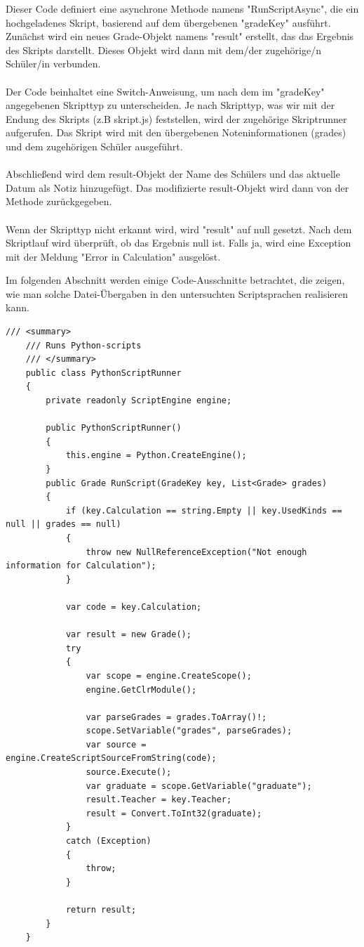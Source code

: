 Dieser Code definiert eine asynchrone Methode namens "RunScriptAsync", die ein hochgeladenes Skript, basierend 
auf dem übergebenen "gradeKey" ausführt. Zunächst wird ein neues Grade-Objekt namens "result" erstellt, das 
das Ergebnis des Skripts darstellt. Dieses Objekt wird dann mit dem/der zugehörige/n Schüler/in verbunden.
\\\\
Der Code beinhaltet eine Switch-Anweisung, um nach dem im "gradeKey" angegebenen Skripttyp zu unterscheiden. 
Je nach Skripttyp, was wir mit der Endung des Skripts (z.B skript.js) feststellen, wird der zugehörige 
Skriptrunner aufgerufen. Das Skript wird mit den übergebenen Noteninformationen (grades) und dem 
zugehörigen Schüler ausgeführt.
\\\\
Abschließend wird dem result-Objekt der Name des Schülers und das aktuelle Datum als Notiz hinzugefügt. 
Das modifizierte result-Objekt wird dann von der Methode zurückgegeben.
\\\\
Wenn der Skripttyp nicht erkannt wird, wird "result" auf null gesetzt. Nach dem Skriptlauf wird überprüft, 
ob das Ergebnis null ist. Falls ja, wird eine Exception mit der Meldung "Error in Calculation" ausgelöst. 

\newpage
Im folgenden Abschnitt  werden einige Code-Ausschnitte betrachtet, die zeigen, wie man solche Datei-Übergaben in den untersuchten Scriptsprachen realisieren kann. 

\begin{lstlisting}[language={[Sharp]C}, caption=Code for IronPython, label=lst:imp:py]
    /// <summary>
    /// Runs Python-scripts
    /// </summary>
    public class PythonScriptRunner
    {
        private readonly ScriptEngine engine;

        public PythonScriptRunner()
        {
            this.engine = Python.CreateEngine();
        }
        public Grade RunScript(GradeKey key, List<Grade> grades)
        {
            if (key.Calculation == string.Empty || key.UsedKinds == null || grades == null)
            {
                throw new NullReferenceException("Not enough information for Calculation");
            }

            var code = key.Calculation;

            var result = new Grade();
            try
            {
                var scope = engine.CreateScope();
                engine.GetClrModule();

                var parseGrades = grades.ToArray()!;
                scope.SetVariable("grades", parseGrades);
                var source = engine.CreateScriptSourceFromString(code);
                source.Execute();
                var graduate = scope.GetVariable("graduate");
                result.Teacher = key.Teacher;
                result = Convert.ToInt32(graduate);
            }
            catch (Exception)
            {
                throw;
            }

            return result;
        }
    }
\end{lstlisting}

